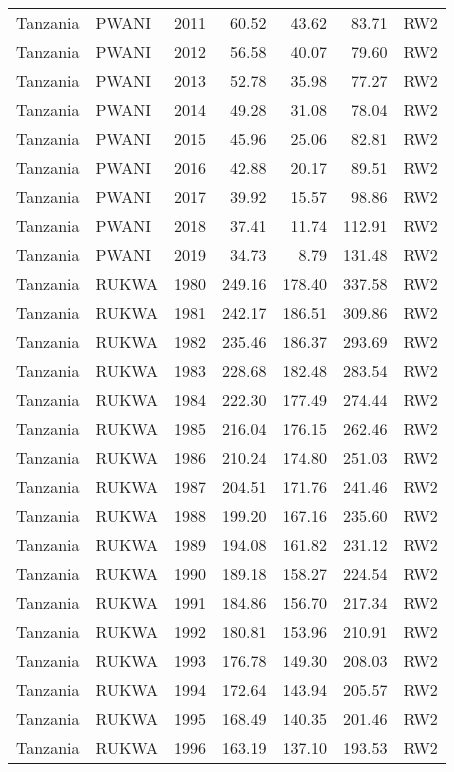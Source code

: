 \begin{longtable}{lllrrrl}
  Tanzania & PWANI & 2011 & 60.52 & 43.62 & 83.71 & RW2 \\ 
  Tanzania & PWANI & 2012 & 56.58 & 40.07 & 79.60 & RW2 \\ 
  Tanzania & PWANI & 2013 & 52.78 & 35.98 & 77.27 & RW2 \\ 
  Tanzania & PWANI & 2014 & 49.28 & 31.08 & 78.04 & RW2 \\ 
  Tanzania & PWANI & 2015 & 45.96 & 25.06 & 82.81 & RW2 \\ 
  Tanzania & PWANI & 2016 & 42.88 & 20.17 & 89.51 & RW2 \\ 
  Tanzania & PWANI & 2017 & 39.92 & 15.57 & 98.86 & RW2 \\ 
  Tanzania & PWANI & 2018 & 37.41 & 11.74 & 112.91 & RW2 \\ 
  Tanzania & PWANI & 2019 & 34.73 & 8.79 & 131.48 & RW2 \\ 
  Tanzania & RUKWA & 1980 & 249.16 & 178.40 & 337.58 & RW2 \\ 
  Tanzania & RUKWA & 1981 & 242.17 & 186.51 & 309.86 & RW2 \\ 
  Tanzania & RUKWA & 1982 & 235.46 & 186.37 & 293.69 & RW2 \\ 
  Tanzania & RUKWA & 1983 & 228.68 & 182.48 & 283.54 & RW2 \\ 
  Tanzania & RUKWA & 1984 & 222.30 & 177.49 & 274.44 & RW2 \\ 
  Tanzania & RUKWA & 1985 & 216.04 & 176.15 & 262.46 & RW2 \\ 
  Tanzania & RUKWA & 1986 & 210.24 & 174.80 & 251.03 & RW2 \\ 
  Tanzania & RUKWA & 1987 & 204.51 & 171.76 & 241.46 & RW2 \\ 
  Tanzania & RUKWA & 1988 & 199.20 & 167.16 & 235.60 & RW2 \\ 
  Tanzania & RUKWA & 1989 & 194.08 & 161.82 & 231.12 & RW2 \\ 
  Tanzania & RUKWA & 1990 & 189.18 & 158.27 & 224.54 & RW2 \\ 
  Tanzania & RUKWA & 1991 & 184.86 & 156.70 & 217.34 & RW2 \\ 
  Tanzania & RUKWA & 1992 & 180.81 & 153.96 & 210.91 & RW2 \\ 
  Tanzania & RUKWA & 1993 & 176.78 & 149.30 & 208.03 & RW2 \\ 
  Tanzania & RUKWA & 1994 & 172.64 & 143.94 & 205.57 & RW2 \\ 
  Tanzania & RUKWA & 1995 & 168.49 & 140.35 & 201.46 & RW2 \\ 
  Tanzania & RUKWA & 1996 & 163.19 & 137.10 & 193.53 & RW2 \\ 

\end{longtable}
